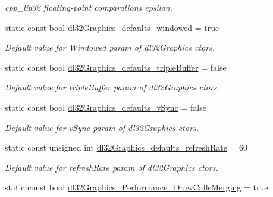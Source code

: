 \begin{DoxyCompactItemize}
\begin{DoxyCompactList}\small\item\em cpp\-\_\-lib32 floating-\/point comparations epsilon. \end{DoxyCompactList}\item 
\hypertarget{classdl32_global_config_afad7dbd9b5226112cace6560848d90e2}{static const bool \hyperlink{classdl32_global_config_afad7dbd9b5226112cace6560848d90e2}{dl32\-Graphics\-\_\-defaults\-\_\-windowed} = true}\label{classdl32_global_config_afad7dbd9b5226112cace6560848d90e2}

\begin{DoxyCompactList}\small\item\em Default value for Windowed param of dl32\-Graphics ctors. \end{DoxyCompactList}\item 
\hypertarget{classdl32_global_config_acde337632acf213c620ba64df40a9759}{static const bool \hyperlink{classdl32_global_config_acde337632acf213c620ba64df40a9759}{dl32\-Graphics\-\_\-defaults\-\_\-triple\-Buffer} = false}\label{classdl32_global_config_acde337632acf213c620ba64df40a9759}

\begin{DoxyCompactList}\small\item\em Default value for triple\-Buffer param of dl32\-Graphics ctors. \end{DoxyCompactList}\item 
\hypertarget{classdl32_global_config_a91d9e58971a5e825d2190ac3f5cc0c8b}{static const bool \hyperlink{classdl32_global_config_a91d9e58971a5e825d2190ac3f5cc0c8b}{dl32\-Graphics\-\_\-defaults\-\_\-v\-Sync} = false}\label{classdl32_global_config_a91d9e58971a5e825d2190ac3f5cc0c8b}

\begin{DoxyCompactList}\small\item\em Default value for v\-Sync param of dl32\-Graphics ctors. \end{DoxyCompactList}\item 
\hypertarget{classdl32_global_config_a5a4f3b231a2c24772a5d6c8cfaab1954}{static const unsigned int \hyperlink{classdl32_global_config_a5a4f3b231a2c24772a5d6c8cfaab1954}{dl32\-Graphics\-\_\-defaults\-\_\-refresh\-Rate} = 60}\label{classdl32_global_config_a5a4f3b231a2c24772a5d6c8cfaab1954}

\begin{DoxyCompactList}\small\item\em Default value for refresh\-Rate param of dl32\-Graphics ctors. \end{DoxyCompactList}\item 
\hypertarget{classdl32_global_config_a708f5f84790a85e6682aeafc1d26f1b4}{static const bool \hyperlink{classdl32_global_config_a708f5f84790a85e6682aeafc1d26f1b4}{dl32\-Graphics\-\_\-\-Performance\-\_\-\-Draw\-Calls\-Merging} = true}\label{classdl32_global_config_a708f5f84790a85e6682aeafc1d26f1b4}


\end{DoxyCompactItemize}

